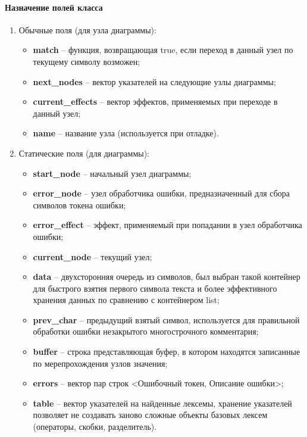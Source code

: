 \documentclass[a4paper,final]{article}
\begin{document}
\paragraph{Назначение полей класса}
\begin{enumerate}[label=]
    \item Обычные поля (для узла диаграммы):
    \begin{itemize}
        \item \textbf{match} -- функция, возвращающая true, если переход в данный узел по текущему символу возможен;
        \item \textbf{next\_nodes} -- вектор указателей на следующие узлы диаграммы;
        \item \textbf{current\_effects} -- вектор эффектов, применяемых при переходе в данный узел;
        \item \textbf{name} -- название узла (используется при отладке).
    \end{itemize}
    \item Статические поля (для диаграммы):
    \begin{itemize}
        \item \textbf{start\_node} -- начальный узел диаграммы;
        \item \textbf{error\_node} -- узел обработчика ошибки, предназначенный для сбора символов токена ошибки;
        \item \textbf{error\_effect} -- эффект, применяемый при попадании в узел обработчика ошибки;
        \item \textbf{current\_node} -- текущий узел;
        \item \textbf{data} -- двухсторонняя очередь из символов, был выбран такой контейнер для быстрого взятия первого символа текста и более эффективного хранения данных по сравнению с контейнером list;
        \item \textbf{prev\_char} -- предыдущий взятый символ, используется для правильной обработки ошибки незакрытого многострочного комментария;
        \item \textbf{buffer} -- строка представляющая буфер, в котором находятся записанные по мерепрохождения узлов значения;
        \item \textbf{errors} -- вектор пар строк <Ошибочный токен, Описание ошибки>;
        \item \textbf{table} -- вектор указателей на найденные лексемы, хранение указателей позволяет не создавать заново сложные объекты базовых лексем (операторы, скобки, разделитель).
    \end{itemize}
\end{enumerate}
\end{document}
